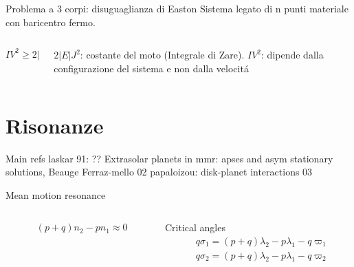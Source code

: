 \begin{frame}{Problema a 3 corpi: disuguaglianza di Easton}
Sistema legato di n punti materiale con baricentro fermo.
\begin{columns}[T]
\begin{column}{0.5\textwidth}
\begin{equation*}
IV^2\geq2|E|J^2
\end{equation*}
\end{column}
\begin{column}{0.5\textwidth}
$2|E|J^2$: costante del moto (Integrale di Zare).
$IV^2$: dipende dalla configurazione del sistema e non dalla velocit\'a
\end{column}
\end{columns}
\end{frame}

\section{Risonanze}

\begin{frame}{Main refs}
laskar 91: ??
Extrasolar planets in mmr: apses and asym stationary solutions, Beauge Ferraz-mello 02
papaloizou: disk-planet interactions 03
\end{frame}

\begin{frame}{Mean motion resonance}
\begin{columns}[T]\begin{column}{0.5\textwidth}
\begin{align*}
&(p+q)n_2-pn_1\approx0
\end{align*}
\end{column}\begin{column}{0.5\textwidth}
Critical angles
\begin{align*}
&q\sigma_1=(p+q)\lambda_2-p\lambda_1-q\varpi_1\\
&q\sigma_2=(p+q)\lambda_2-p\lambda_1-q\varpi_2
\end{align*}
\end{column}\end{columns}
\end{frame}
